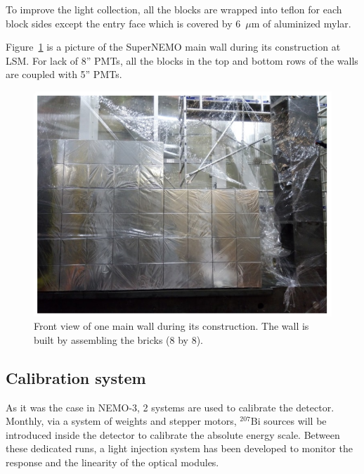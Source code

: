 \documentclass[main.tex]{subfiles}
\begin{document}
\NI To improve the light collection, all the blocks are wrapped into teflon for each block sides except the entry face which is covered by 6~$\mu$m of aluminized mylar.


\bigskip


\NI Figure~\ref{SnemoCaloFrontView} is a picture of the SuperNEMO main wall during its construction at LSM. For lack of 8'' PMTs, all the blocks in the top and bottom rows of the walls are coupled with 5'' PMTs.


\begin{figure}[h!]
\begin{center}
\includegraphics[scale=0.5]{pictures/Chap3/FrontViewCalo.png}
\caption{Front view of one main wall during its construction. The wall is built by assembling the bricks (8 by 8).}
\label{SnemoCaloFrontView}
\end{center}
\end{figure}

\FloatBarrier


\subsection{Calibration system}


\NI As it was the case in NEMO-3, 2 systems are used to calibrate the detector. Monthly, via a system of weights and stepper motors, $^{\text{207}}$Bi sources will be introduced inside the detector to calibrate the absolute energy scale. Between these dedicated runs, a light injection system has been developed to monitor the response and the linearity of the optical modules.
\end{document}
